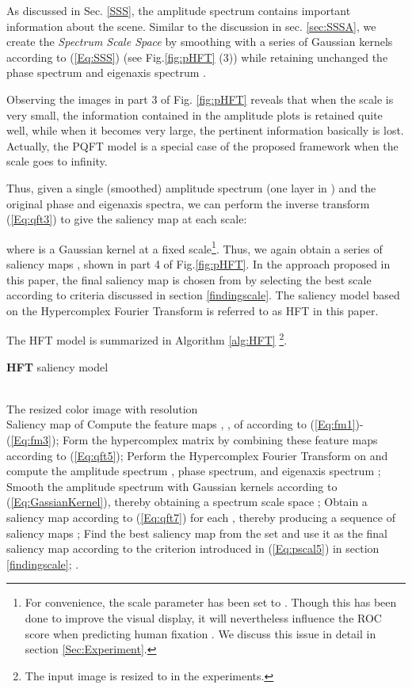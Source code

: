 \documentclass[10pt,journal,cspaper,compsoc]{IEEEtran}
\begin{document}
As discussed in Sec. \ref{SSS}, the amplitude spectrum contains important information about the scene. Similar to the discussion in sec. \ref{sec:SSSA}, we create the {\it Spectrum Scale Space}  by smoothing  with a series of Gaussian kernels according to (\ref{Eq:SSS}) (see Fig.\ref{fig:pHFT} (3)) while retaining unchanged the phase spectrum  and eigenaxis spectrum .

Observing the images in part 3 of Fig. \ref{fig:pHFT} reveals that when the scale  is very small, the information contained in the amplitude plots is retained quite well, while when it becomes very large, the pertinent information basically is lost. Actually, the PQFT model is a special case of the proposed framework when the scale goes to infinity.

Thus, given a single (smoothed) amplitude spectrum  (one layer in ) and the original phase and eigenaxis spectra, we can perform the inverse transform (\ref{Eq:qft3}) to give the saliency map at each scale:

where  is a Gaussian kernel at a fixed scale\footnote{For convenience, the scale parameter has been set to . Though this has been done to improve the visual display, it will nevertheless influence the ROC score when predicting human fixation \cite{ImageSignature2012}. We discuss this issue in detail in section \ref{Sec:Experiment}.}. Thus, we again obtain a series of saliency maps , shown in part 4 of Fig.\ref{fig:pHFT}. In the  approach proposed in this paper, the final saliency map  is chosen from  by selecting the best scale  according to criteria discussed in section \ref{findingscale}. The saliency model based on the  Hypercomplex Fourier Transform is referred to as HFT in this paper.

The HFT model is  summarized in Algorithm \ref{alg:HFT} \footnote{The input image is resized to  in the experiments.}.
\begin{algorithm}[htb]         \caption{{\bf HFT }saliency model}             \label{alg:HFT}                  \begin{algorithmic}[1]                \REQUIRE ~~\\                          The resized color image  with resolution 
\ENSURE ~~\\                           Saliency map  of 
\vspace{0.15cm}
\STATE Compute the feature maps , ,  of  according to (\ref{Eq:fm1})-(\ref{Eq:fm3});
\STATE Form the hypercomplex matrix  by combining these feature maps according to (\ref{Eq:qft5});
\STATE Perform the Hypercomplex Fourier Transform on  and compute the amplitude spectrum , phase spectrum,  and eigenaxis spectrum ;
\STATE Smooth the amplitude spectrum with Gaussian kernels according to (\ref{Eq:GassianKernel}), thereby obtaining a spectrum scale space  ;
\STATE Obtain a saliency map  according to (\ref{Eq:qft7}) for each , thereby producing a sequence of saliency maps ;
\STATE Find the best saliency map  from the set  and use it as the final saliency map  according to the criterion introduced in (\ref{Eq:pscal5}) in section \ref{findingscale};
\RETURN .                \end{algorithmic}
\end{algorithm}
\end{document}
